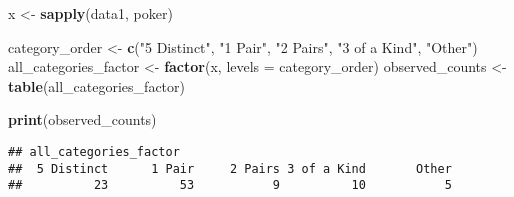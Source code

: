 \documentclass[
  persian,
]{article}
\newenvironment{Shaded}{\begin{snugshade}}{\end{snugshade}}
\newcommand{\AttributeTok}[1]{\textcolor[rgb]{0.13,0.29,0.53}{#1}}
\newcommand{\FunctionTok}[1]{\textcolor[rgb]{0.13,0.29,0.53}{\textbf{#1}}}
\newcommand{\NormalTok}[1]{#1}
\newcommand{\OtherTok}[1]{\textcolor[rgb]{0.56,0.35,0.01}{#1}}
\newcommand{\StringTok}[1]{\textcolor[rgb]{0.31,0.60,0.02}{#1}}
\begin{document}
\begin{Shaded}
\begin{Highlighting}[]
\NormalTok{x }\OtherTok{\textless{}{-}} \FunctionTok{sapply}\NormalTok{(data1, poker)}

\NormalTok{category\_order }\OtherTok{\textless{}{-}} \FunctionTok{c}\NormalTok{(}\StringTok{"5 Distinct"}\NormalTok{, }\StringTok{"1 Pair"}\NormalTok{, }\StringTok{"2 Pairs"}\NormalTok{, }\StringTok{"3 of a Kind"}\NormalTok{, }\StringTok{"Other"}\NormalTok{)}
\NormalTok{all\_categories\_factor }\OtherTok{\textless{}{-}} \FunctionTok{factor}\NormalTok{(x, }\AttributeTok{levels =}\NormalTok{ category\_order)}
\NormalTok{observed\_counts }\OtherTok{\textless{}{-}} \FunctionTok{table}\NormalTok{(all\_categories\_factor)}

\FunctionTok{print}\NormalTok{(observed\_counts)}
\end{Highlighting}
\end{Shaded}

\persian\latin

\begin{verbatim}
## all_categories_factor
##  5 Distinct      1 Pair     2 Pairs 3 of a Kind       Other 
##          23          53           9          10           5
\end{verbatim}

\persian
\end{document}
